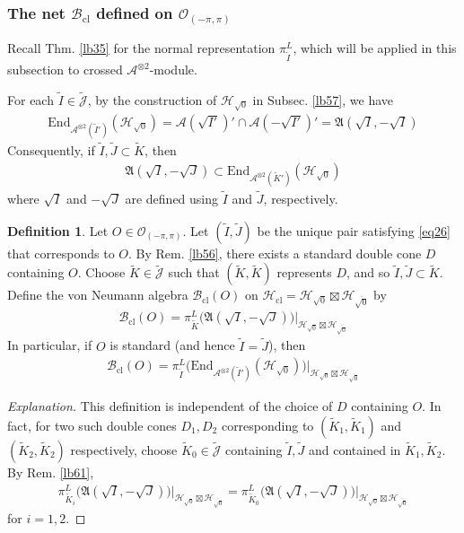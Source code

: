 \documentclass[11pt,b5paper,notitlepage]{article}
\theoremstyle{definition}
\newtheorem{df}{Definition}[section]
\theoremstyle{plain}
\newcommand{\fk}{\mathfrak}
\newcommand{\wtd}{\widetilde}
\newcommand{\ovl}{\overline}
\newcommand{\End}{\mathrm{End}} %
\newcommand{\Jtd}{\widetilde{\mathcal J}}
\newcommand{\MA}{\mathcal A}
\newcommand{\MH}{\mathcal H}
\newcommand{\Maa}{{\mathcal A^{\otimes 2}}}
\newcommand{\sqz}{{\sqrt 0}}
\newcommand{\Bcl}{\mathcal B_{\mathrm{cl}}}
\newcommand{\Opp}{\mathcal O_{(-\pi,\pi)}}
\newcommand{\Hcl}{\mathcal H_{\mathrm{cl}}}
\numberwithin{equation}{section}
\begin{document}
\subsubsection{The net $\Bcl$  defined on $\Opp$}

Recall Thm. \ref{lb35} for the normal representation $\pi^L_{\wtd I}$, which will be applied in this subsection to crossed $\Maa$-module.

For each $\wtd I\in\Jtd$, by the construction of $\MH_\sqz$ in Subsec. \ref{lb57}, we have
\begin{align}\label{eq27}
\End_{\Maa(\wtd I')}(\MH_\sqz)=\MA(\sqrt{I'})'\cap\MA(-\sqrt{I'})'=\fk A(\sqrt I,-\sqrt I)
\end{align}
Consequently, if $\wtd I,\wtd J\subset\wtd K$, then
\begin{align}\label{eq70}
\fk A(\sqrt I,-\sqrt J)\subset \End_{\Maa(\wtd K')}(\MH_\sqz)
\end{align}
where $\sqrt{I}$ and $-\sqrt{J}$ are defined using $\wtd I$ and $\wtd J$, respectively.

\begin{df}\label{lb64}
Let $O\in\Opp$. Let $(\wtd I,\wtd J)$ be the unique pair satisfying \eqref{eq26} that corresponds to $O$. By Rem. \ref{lb56}, there exists a standard double cone $D$ containing $O$. Choose $\wtd K\in\Jtd$ such that $(\wtd K,\wtd K)$ represents $D$, and so $\wtd I,\wtd J\subset\wtd K$. Define the von Neumann algebra $\Bcl(O)$ on $\Hcl=\MH_\sqz\boxtimes\MH_{\ovl\sqz}$ by
\begin{align*}
\Bcl(O)=\pi^L_{\wtd K}\big(\fk A(\sqrt I,-\sqrt J)\big)\big|_{\MH_\sqz\boxtimes\MH_{\ovl\sqz}}
\end{align*}
In particular, if $O$ is standard (and hence $\wtd I=\wtd J$), then
\begin{align}\label{eq50}
\Bcl(O)=\pi^L_{\wtd I}\big(\End_{\Maa(\wtd I')}(\MH_\sqz)\big)\big|_{\MH_\sqz\boxtimes\MH_{\ovl\sqz}}
\end{align}
\end{df}

\begin{proof}[Explanation]
This definition is independent of the choice of $D$ containing $O$. In fact, for two such double cones $D_1,D_2$ corresponding to $(\wtd K_1,\wtd K_1)$ and $(\wtd K_2,\wtd K_2)$ respectively, choose $\wtd K_0\in\Jtd$ containing $\wtd I,\wtd J$ and contained in $\wtd K_1,\wtd K_2$. By Rem. \ref{lb61},
\begin{align*}
\pi^L_{\wtd K_i}\big(\fk A(\sqrt I,-\sqrt J)\big)\big|_{\MH_\sqz\boxtimes\MH_{\ovl\sqz}}=\pi^L_{\wtd K_0}\big(\fk A(\sqrt I,-\sqrt J)\big)\big|_{\MH_\sqz\boxtimes\MH_{\ovl\sqz}}
\end{align*}
for $i=1,2$.
\end{proof}
\end{document}
